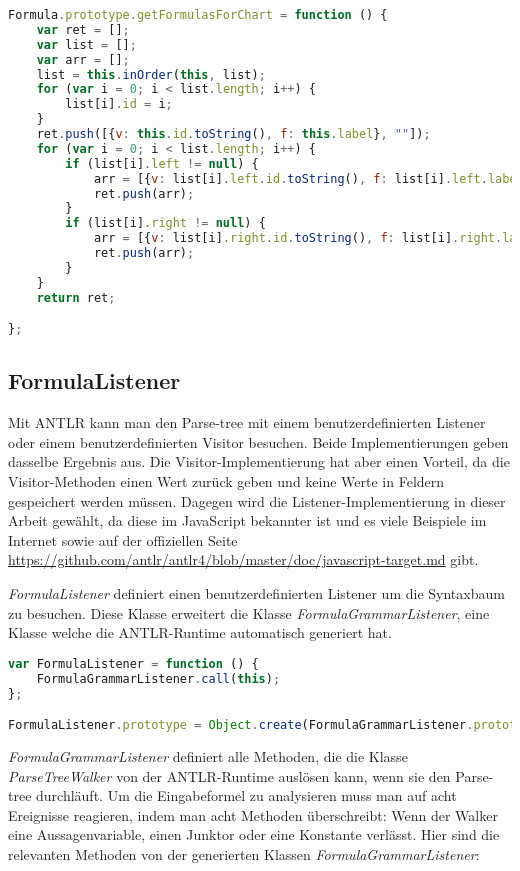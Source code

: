 \begin{lstlisting}[language=JavaScript, caption= getFormulasForChart()(Klasse Formula), basicstyle=\scriptsize]
Formula.prototype.getFormulasForChart = function () {
    var ret = [];
    var list = [];
    var arr = [];
    list = this.inOrder(this, list);
    for (var i = 0; i < list.length; i++) {
        list[i].id = i;
    }
    ret.push([{v: this.id.toString(), f: this.label}, ""]);
    for (var i = 0; i < list.length; i++) {
        if (list[i].left != null) {
            arr = [{v: list[i].left.id.toString(), f: list[i].left.label}, list[i].id.toString()];
            ret.push(arr);
        }
        if (list[i].right != null) {
            arr = [{v: list[i].right.id.toString(), f: list[i].right.label}, list[i].id.toString()];
            ret.push(arr);
        }
    }
    return ret;

};
\end{lstlisting}

\subsection{FormulaListener}
Mit ANTLR kann man den Parse-tree mit einem benutzerdefinierten Listener oder einem benutzerdefinierten Visitor besuchen.
Beide Implementierungen geben dasselbe Ergebnis aus. Die Visitor-Implementierung hat aber einen Vorteil, da die Visitor-Methoden einen Wert zurück geben und keine Werte in Feldern gespeichert werden müssen. Dagegen wird die Listener-Implementierung in dieser Arbeit gewählt, da diese im JavaScript bekannter ist und es viele Beispiele im Internet sowie auf der offiziellen Seite \url{https://github.com/antlr/antlr4/blob/master/doc/javascript-target.md} gibt.

\textit{FormulaListener} definiert einen benutzerdefinierten Listener um die Syntaxbaum zu besuchen. Diese Klasse erweitert die Klasse \textit{FormulaGrammarListener}, eine Klasse welche die ANTLR-Runtime automatisch generiert hat.

\begin{lstlisting}[language=JavaScript, caption= FormulaListener Konstruktor, basicstyle=\scriptsize]
 var FormulaListener = function () {
    FormulaGrammarListener.call(this);
};

FormulaListener.prototype = Object.create(FormulaGrammarListener.prototype);
\end{lstlisting}


\textit{FormulaGrammarListener} definiert alle Methoden, die die Klasse \textit{ParseTreeWalker} von der ANTLR-Runtime auslösen kann, wenn sie den Parse-tree durchläuft. Um die Eingabeformel zu analysieren muss man auf acht Ereignisse reagieren, indem man acht Methoden überschreibt: Wenn der Walker eine Aussagenvariable, einen Junktor oder eine Konstante verlässt. Hier sind die relevanten Methoden von der generierten Klassen \textit{FormulaGrammarListener}: 

